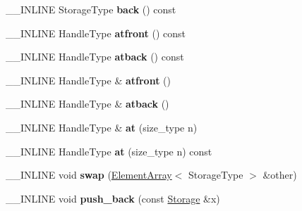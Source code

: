 \begin{DoxyCompactItemize}
\item 
\hypertarget{classINMOST_1_1ElementArray_aadf2d79eb365c4e68eafa3f7317c85ec}{\-\_\-\-\_\-\-I\-N\-L\-I\-N\-E Storage\-Type {\bfseries back} () const }\label{classINMOST_1_1ElementArray_aadf2d79eb365c4e68eafa3f7317c85ec}

\item 
\hypertarget{classINMOST_1_1ElementArray_ac9dac775a6fd6c690103bc2b1f4722e3}{\-\_\-\-\_\-\-I\-N\-L\-I\-N\-E Handle\-Type {\bfseries atfront} () const }\label{classINMOST_1_1ElementArray_ac9dac775a6fd6c690103bc2b1f4722e3}

\item 
\hypertarget{classINMOST_1_1ElementArray_afb508658d2215aa9f9168a65f491d4b8}{\-\_\-\-\_\-\-I\-N\-L\-I\-N\-E Handle\-Type {\bfseries atback} () const }\label{classINMOST_1_1ElementArray_afb508658d2215aa9f9168a65f491d4b8}

\item 
\hypertarget{classINMOST_1_1ElementArray_abe9570fe06bdc866cae805e770e3bd42}{\-\_\-\-\_\-\-I\-N\-L\-I\-N\-E Handle\-Type \& {\bfseries atfront} ()}\label{classINMOST_1_1ElementArray_abe9570fe06bdc866cae805e770e3bd42}

\item 
\hypertarget{classINMOST_1_1ElementArray_a57a652ebd24a7f13d09f246627c98165}{\-\_\-\-\_\-\-I\-N\-L\-I\-N\-E Handle\-Type \& {\bfseries atback} ()}\label{classINMOST_1_1ElementArray_a57a652ebd24a7f13d09f246627c98165}

\item 
\hypertarget{classINMOST_1_1ElementArray_a1933d0da6ec1f0944c4172adc1c63982}{\-\_\-\-\_\-\-I\-N\-L\-I\-N\-E Handle\-Type \& {\bfseries at} (size\-\_\-type n)}\label{classINMOST_1_1ElementArray_a1933d0da6ec1f0944c4172adc1c63982}

\item 
\hypertarget{classINMOST_1_1ElementArray_a1d744e7c7c5671ea71a7fe4be72c6ba4}{\-\_\-\-\_\-\-I\-N\-L\-I\-N\-E Handle\-Type {\bfseries at} (size\-\_\-type n) const }\label{classINMOST_1_1ElementArray_a1d744e7c7c5671ea71a7fe4be72c6ba4}

\item 
\hypertarget{classINMOST_1_1ElementArray_a039ee514a155ad0e9da34fc7158486f2}{\-\_\-\-\_\-\-I\-N\-L\-I\-N\-E void {\bfseries swap} (\hyperlink{classINMOST_1_1ElementArray}{Element\-Array}$<$ Storage\-Type $>$ \&other)}\label{classINMOST_1_1ElementArray_a039ee514a155ad0e9da34fc7158486f2}

\item 
\hypertarget{classINMOST_1_1ElementArray_a12e39ff84d7862daff58db1536fc47b9}{\-\_\-\-\_\-\-I\-N\-L\-I\-N\-E void {\bfseries push\-\_\-back} (const \hyperlink{classINMOST_1_1Storage}{Storage} \&x)}\label{classINMOST_1_1ElementArray_a12e39ff84d7862daff58db1536fc47b9}


\end{DoxyCompactItemize}
